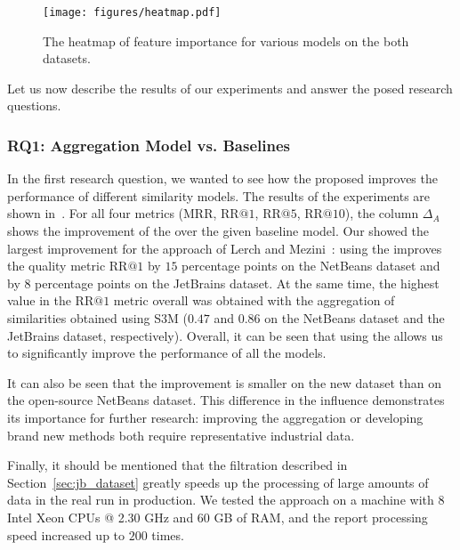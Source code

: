 \begin{figure*}[htbp]
\centering
    \texttt{[image: figures/heatmap.pdf]}
    \centering
    \vspace{-0.4cm}
    \caption{The heatmap of feature importance for various models on the both datasets.}
    \label{fig:jb_features}
\end{figure*}

Let us now describe the results of our experiments and answer the posed research questions.

\subsubsection{RQ1: Aggregation Model vs. Baselines}

In the first research question, we wanted to see how the proposed \ag improves the performance of different similarity models. The results of the experiments are shown in~. For all four metrics (MRR, $\mathrm{RR} @ 1$, $\mathrm{RR} @ 5$, $\mathrm{RR} @ 10$), the column $\Delta_{A}$ shows the improvement of the \ag over the given baseline model.
Our \ag showed the largest improvement for the approach of Lerch and Mezini~\cite{lerch}: using the \ag improves the quality metric $\mathrm{RR} @ 1$ by $15$ percentage points on the NetBeans dataset and by $8$ percentage points on the JetBrains dataset. At the same time, the highest value in the $\mathrm{RR} @ 1$ metric overall was obtained with the aggregation of similarities obtained using S3M ($0.47$ and $0.86$ on the NetBeans dataset and the JetBrains dataset, respectively). Overall, it can be seen that using the \ag allows us to significantly improve the performance of all the models.

It can also be seen that the improvement is smaller on the new dataset than on the open-source NetBeans dataset. This difference in the influence demonstrates its importance for further research: improving the aggregation or developing brand new methods both require representative industrial data.

Finally, it should be mentioned that the filtration described in Section~\ref{sec:jb_dataset} greatly speeds up the processing of large amounts of data in the real run in production. We tested the approach on a machine with 8 Intel Xeon CPUs @ 2.30 GHz and 60 GB of RAM, and the report processing speed increased up to $200$ times.


